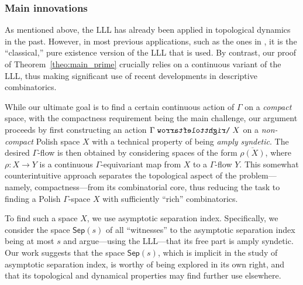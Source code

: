 \documentclass[11pt,reqno,psamsfonts]{amsart}
\theoremstyle{bfnote}
\theoremstyle{definition}
\theoremstyle{remark}
\newcommand{\0}{\varnothing}
\newcommand{\acts}{\mathrel{\reflectbox{$\righttoleftarrow$}}}
\newcommand{\G}{\Gamma}
\newcommand{\sr}{amply syndetic\xspace}
\newcommand{\Sep}{\mathsf{Sep}}
\numberwithin{equation}{section}
\begin{document}
    \subsubsection*{Main innovations} %
    As mentioned above, the LLL has already been applied in topological dynamics in the past. However, in most previous applications, such as the ones in \cite{Elek,ABT,LLLDyn1,LLLDyn3}, it is the ``classical,'' pure existence version of the LLL that is used. By contrast, our proof of Theorem~\ref{theo:main_prime} crucially relies on a continuous variant of the LLL, thus making significant use of recent developments in descriptive combinatorics.
    
        While our ultimate goal is to find a certain continuous action of $\G$ on a \emph{compact} space, with the compactness requirement being the main challenge, our argument proceeds by first constructing an action $\G \acts X$ on a \emph{non-compact} Polish space $X$ with a technical property of being \emph{\sr}. %
        The desired $\G$-flow is then obtained by considering spaces of the form $\overline{\rho(X)}$, where $\rho \colon X \to Y$ is a continuous $\G$-equivariant map from $X$ to a $\G$-flow $Y$. %
        This somewhat counterintuitive approach separates the topological aspect of the problem---namely, compactness---from its combinatorial core, thus reducing the task to finding a Polish $\G$-space $X$ with sufficiently ``rich'' combinatorics.

        To find such a space $X$, we use asymptotic separation index. Specifically, we consider the space $\Sep(s)$ of all ``witnesses'' to the asymptotic separation index being at most $s$ and argue---using the LLL---that its free part is amply syndetic. Our work suggests that %
        the space $\Sep(s)$, which is implicit in the study of asymptotic separation index, %
        is worthy of being explored in its own right, and that its topological and dynamical properties %
         may find further use elsewhere.

\end{document}
